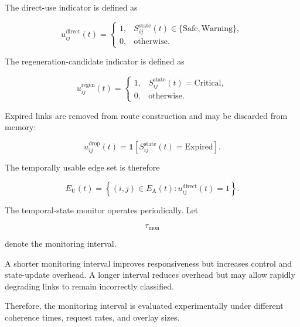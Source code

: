 The direct-use indicator is defined as

\begin{equation}
    u_{ij}^{\mathrm{direct}}(t)
    =
    \begin{cases}
        1,
        &
        S_{ij}^{\mathrm{state}}(t)
        \in
        \{\mathrm{Safe},\mathrm{Warning}\},\\
        0,
        &
        \text{otherwise}.
    \end{cases}
\end{equation}

The regeneration-candidate indicator is defined as

\begin{equation}
    u_{ij}^{\mathrm{regen}}(t)
    =
    \begin{cases}
        1,
        &
        S_{ij}^{\mathrm{state}}(t)
        =
        \mathrm{Critical},\\
        0,
        &
        \text{otherwise}.
    \end{cases}
\end{equation}

Expired links are removed from route construction and may be discarded from memory:

\begin{equation}
    u_{ij}^{\mathrm{drop}}(t)
    =
    \mathbf{1}
    \left[
    S_{ij}^{\mathrm{state}}(t)
    =
    \mathrm{Expired}
    \right].
\end{equation}

The temporally usable edge set is therefore

\begin{equation}
    E_{\mathrm{U}}(t)
    =
    \left\{
    (i,j)
    \in
    E_{\mathrm{A}}(t)
    :
    u_{ij}^{\mathrm{direct}}(t)=1
    \right\}.
\end{equation}

The temporal-state monitor operates periodically. Let

\begin{equation}
    \tau_{\mathrm{mon}}
\end{equation}

denote the monitoring interval.

A shorter monitoring interval improves responsiveness but increases control and state-update overhead. A longer interval reduces overhead but may allow rapidly degrading links to remain incorrectly classified.

Therefore, the monitoring interval is evaluated experimentally under different coherence times, request rates, and overlay sizes.

